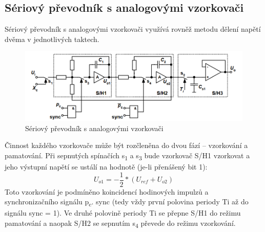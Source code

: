 \subsection{Sériový převodník s analogovými vzorkovači}
Sériový převodník s analogovými vzorkovači využívá rovněž metodu dělení napětí dvěma v jednotlivých taktech. 
\begin{figure}[h]
   \begin{center}
     \includegraphics[scale=0.6]{images/DA2.png}
   \end{center}
   \caption{Sériový převodník s analogovými vzorkovači}
\end{figure}
Činnost každého vzorkovače může být rozčleněna do dvou fází – vzorkování a pamatování. Při sepnutých spínačích s\textsubscript{1} a s\textsubscript{3} bude vzorkovač S/H1 vzorkovat a jeho výstupní napětí se ustálí na hodnotě (je-li přenášený bit 1):
\begin{equation}
U_{o1}=-\frac{1}{2}*(U_{ref}+U_{o2})
\end{equation}
Toto vzorkování je podmíněno koincidencí hodinových impulzů a synchronizačního signálu p\textsubscript{c}. sync (tedy vždy první polovina periody Ti až do signálu sync = 1). Ve druhé polovině periody Ti se přepne S/H1 do režimu pamatování a naopak S/H2 se sepnutím s\textsubscript{4} převede do režimu vzorkování.

